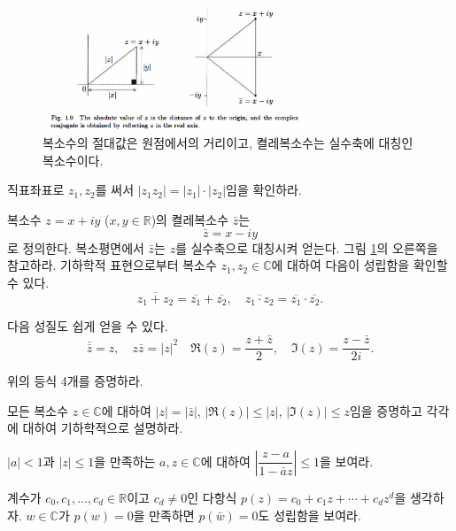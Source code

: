 \begin{figure}[!h]
\begin{center}
\includegraphics[width=0.7\textwidth]{./SaltChapter/fig-1-9}
\end{center}
\caption{복소수의 절대값은 원점에서의 거리이고, 켤레복소수는 실수축에 대칭인 복소수이다.}
\label{fig-1-9}
\end{figure}

\begin{salt_exercise} \label{ex-1-14}
직표좌표로 $z_1, z_2$를 써서 $|z_1z_2| = |z_1|\cdot |z_2|$임을 확인하라.
\end{salt_exercise}

복소수 $z=x+iy$ ($x,y\in\mathbb R$)의 켤레복소수 $\bar z$는
$$
\bar z = x - iy
$$
로 정의한다.
복소평면에서 $\bar z$는 $z$를 실수축으로 대칭시켜 얻는다.
그림 \ref{fig-1-9}의 오른쪽을 참고하라.
기하학적 표현으로부터 복소수 $z_1, z_2\in\mathbb C$에 대하여
다음이 성립함을 확인할 수 있다.
$$
\overline{z_1+z_2} = \overline{z_1} + \overline{z_2},
\quad
\overline{z_1\cdot z_2} = \overline{z_1} \cdot \overline{z_2}.
$$

다음 성질도 쉽게 얻을 수 있다.
$$
\bar{\bar z} = z, \quad z\bar z  = |z|^2 \quad
\Re(z) = \frac{z+\bar z}2, \quad \Im(z) = \frac{z-\bar z}{2i}.
$$

\begin{salt_exercise} \label{ex-1-15}
위의 등식 4개를 증명하라.
\end{salt_exercise}

\begin{salt_exercise} \label{ex-1-16}
모든 복소수 $z\in\mathbb C$에 대하여
$|z|=|\bar z|$, $|\Re(z)|\le |z|$, $|\Im(z)| \le z$임을 증명하고
각각에 대하여 기하학적으로 설명하라.
\end{salt_exercise}

\begin{salt_exercise} \label{ex-1-17}
$|a|<1$과 $|z|\le 1$을 만족하는 $a,z\in\mathbb C$에 대하여
$\left| \dfrac{z-a}{1-\bar a z}\right| \le 1$을 보여라.
\end{salt_exercise}

\begin{salt_exercise} \label{ex-1-18}
계수가 $c_0, c_1, \ldots, c_d\in\mathbb R$이고 $c_d\ne0$인 다항식
$p(z) = c_0+c_1z+\cdots + c_dz^d$을 생각하자.
$w\in\mathbb C$가 $p(w)=0$을 만족하면 $p(\bar w)=0$도 성립함을 보여라.
\end{salt_exercise}


